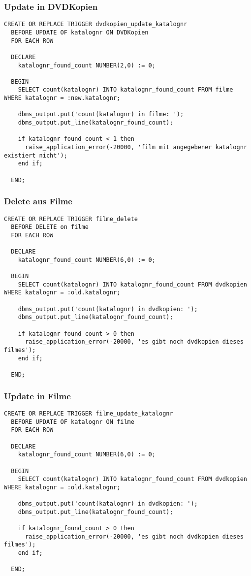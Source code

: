 \documentclass[11pt,a4paper,parskip=half]{scrartcl}
\begin{document}
\subsubsection{Update in DVDKopien}
\begin{lstlisting}
CREATE OR REPLACE TRIGGER dvdkopien_update_katalognr
  BEFORE UPDATE OF katalognr ON DVDKopien
  FOR EACH ROW
  
  DECLARE
    katalognr_found_count NUMBER(2,0) := 0;
    
  BEGIN
    SELECT count(katalognr) INTO katalognr_found_count FROM filme WHERE katalognr = :new.katalognr;
    
    dbms_output.put('count(katalognr) in filme: ');
    dbms_output.put_line(katalognr_found_count);
    
    if katalognr_found_count < 1 then
      raise_application_error(-20000, 'film mit angegebener katalognr existiert nicht');
    end if;
    
  END;
\end{lstlisting}

\subsubsection{Delete aus Filme}
\begin{lstlisting}
CREATE OR REPLACE TRIGGER filme_delete
  BEFORE DELETE on filme
  FOR EACH ROW
  
  DECLARE
    katalognr_found_count NUMBER(6,0) := 0;
    
  BEGIN
    SELECT count(katalognr) INTO katalognr_found_count FROM dvdkopien WHERE katalognr = :old.katalognr;
    
    dbms_output.put('count(katalognr) in dvdkopien: ');
    dbms_output.put_line(katalognr_found_count);
    
    if katalognr_found_count > 0 then
      raise_application_error(-20000, 'es gibt noch dvdkopien dieses filmes');
    end if;
    
  END;
\end{lstlisting}

\subsubsection{Update in Filme}
\begin{lstlisting}
CREATE OR REPLACE TRIGGER filme_update_katalognr
  BEFORE UPDATE OF katalognr ON filme
  FOR EACH ROW
  
  DECLARE
    katalognr_found_count NUMBER(6,0) := 0;
    
  BEGIN
    SELECT count(katalognr) INTO katalognr_found_count FROM dvdkopien WHERE katalognr = :old.katalognr;
    
    dbms_output.put('count(katalognr) in dvdkopien: ');
    dbms_output.put_line(katalognr_found_count);
    
    if katalognr_found_count > 0 then
      raise_application_error(-20000, 'es gibt noch dvdkopien dieses filmes');
    end if;
    
  END;
\end{lstlisting}
\end{document}
